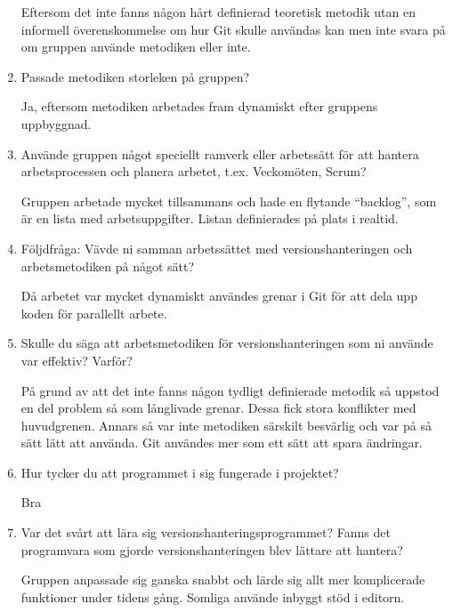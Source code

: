 \begin{enumerate}
    Eftersom det inte fanns någon hårt definierad teoretisk metodik utan en informell överenskommelse om hur Git skulle användas kan men inte svara på om gruppen använde metodiken eller inte.

    \item Passade metodiken storleken på gruppen?

    Ja, eftersom metodiken arbetades fram dynamiskt efter gruppens uppbyggnad.

    \item Använde gruppen något speciellt ramverk eller arbetssätt för att hantera arbetsprocessen och planera arbetet, t.ex. Veckomöten, Scrum?

    Gruppen arbetade mycket tillsammans och hade en flytande ``backlog'', som är en lista med arbetsuppgifter. Listan definierades på plats i realtid.

    \item Följdfråga: Vävde ni samman arbetssättet med versionshanteringen och arbetsmetodiken på något sätt?

    Då arbetet var mycket dynamiskt användes grenar i Git för att dela upp koden för parallellt arbete.

    \item Skulle du säga att arbetsmetodiken för versionshanteringen som ni använde var effektiv? Varför?

    På grund av att det inte fanns någon tydligt definierade metodik så uppstod en del problem så som långlivade grenar. Dessa fick stora konflikter med huvudgrenen. Annars så var inte metodiken särskilt besvärlig och var på så sätt lätt att använda. Git användes mer som ett sätt att spara ändringar.

    \item Hur tycker du att programmet i sig fungerade i projektet?

    Bra

    \item Var det svårt att lära sig versionshanteringsprogrammet? Fanns det programvara som gjorde versionshanteringen blev lättare att hantera?

    Gruppen anpassade sig ganska snabbt och lärde sig allt mer komplicerade funktioner under tidens gång. Somliga använde inbyggt stöd i editorn.
\end{enumerate}






